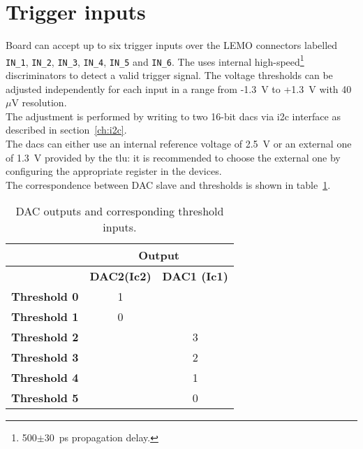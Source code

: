 \section{Trigger inputs}
Board \brd can accept up to six trigger inputs over the LEMO connectors labelled \verb|IN_1|, \verb|IN_2|, \verb|IN_3|, \verb|IN_4|, \verb|IN_5| and \verb|IN_6|. The \brd uses internal high-speed\footnote{500$\pm$30~ps propagation delay.} discriminators to detect a valid trigger signal. The voltage thresholds can be adjusted independently for each input in a range from -1.3~V to +1.3~V with 40~$\mu$V resolution.\\
The adjustment is performed by writing to two 16-bit \gls{dac}s via \gls{i2c} interface as described in section~\ref{ch:i2c}.\\
The \gls{dac}s can either use an internal reference voltage of 2.5~V or an external one of 1.3~V provided by the \gls{tlu}: it is recommended to choose the external one by configuring the appropriate register in the devices.\\
The correspondence between DAC slave and thresholds is shown in table~\ref{tab:DACOutputs}.
\begin{table}[]
\centering
\caption{DAC outputs and corresponding threshold inputs.}
\label{tab:DACOutputs}
\begin{tabular}{|l|c|c|}
\hline
                     & \multicolumn{2}{c|}{Output}                                                        \\ \hline
                     & \multicolumn{1}{l|}{\textbf{DAC2(Ic2)}} & \multicolumn{1}{l|}{\textbf{DAC1 (Ic1)}} \\ \hline
\textbf{Threshold 0} & 1                                       &                                          \\ \hline
\textbf{Threshold 1} & 0                                       &                                          \\ \hline
\textbf{Threshold 2} &                                         & 3                                        \\ \hline
\textbf{Threshold 3} &                                         & 2                                        \\ \hline
\textbf{Threshold 4} &                                         & 1                                        \\ \hline
\textbf{Threshold 5} &                                         & 0                                        \\ \hline
\end{tabular}
\end{table}


